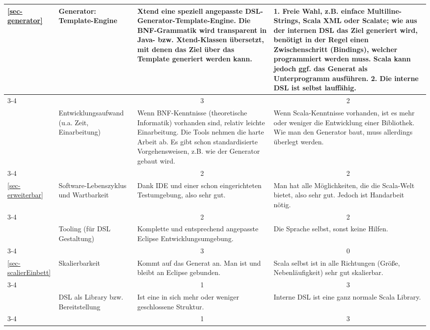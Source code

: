 \begin{landscape}
\begin{longtable}{|p{0.8cm}|p{4.4cm}|p{6.4cm}|p{6.4cm}|}
  \ref{sec-generator}
  & Generator: Template-Engine
  & Xtend eine speziell angepasste DSL-Generator-Template-Engine.
    Die BNF-Grammatik wird transparent in Java- bzw. Xtend-Klassen übersetzt,
    mit denen das Ziel über das Template generiert werden kann.
  & 1. Freie Wahl, z.B. einface Multiline-Strings, Scala XML oder Scalate;
    wie aus der internen DSL das Ziel generiert wird, benötigt in der Regel
    einen Zwischenschritt (Bindings), welcher programmiert werden muss.
    Scala kann jedoch ggf. das Generat als Unterprogramm ausführen.
    2. Die interne DSL ist selbst lauffähig.
  \\
  \cline{3-4}
  & & \multicolumn{1}{c|}{ 3 } & \multicolumn{1}{c|}{ 2 } \\ \hline

  & Entwicklungsaufwand (u.a. Zeit, Einarbeitung)
  & Wenn BNF-Kenntnisse (theoretische Informatik) vorhanden sind,
    relativ leichte Einarbeitung.
    Die Tools nehmen die harte Arbeit ab. Es gibt schon standardisierte
    Vorgehensweisen, z.B. wie der Generator gebaut wird.
  & Wenn Scala-Kenntnisse vorhanden, ist es mehr oder weniger die Entwicklung
    einer Bibliothek.
    Wie man den Generator baut, muss allerdings überlegt werden.
  \\
  \cline{3-4}
  & & \multicolumn{1}{c|}{ 2 } & \multicolumn{1}{c|}{ 2 } \\ \hline

  \ref{sec-erweiterbar}
  & Software-Lebenszyklus und Wartbarkeit
  & Dank IDE und einer schon eingerichteten Testumgebung, also sehr gut.
  & Man hat alle Möglichkeiten, die die Scala-Welt bietet, also sehr gut.
    Jedoch ist Handarbeit nötig.
  \\
  \cline{3-4}
  & & \multicolumn{1}{c|}{ 2 } & \multicolumn{1}{c|}{ 2 } \\ \hline

  & Tooling (für DSL Gestaltung)
  & Komplette und entsprechend angepasste Eclipse Entwicklungsumgebung.
  & Die Sprache selbst, sonst keine Hilfen.
  \\
  \cline{3-4}
  & & \multicolumn{1}{c|}{ 3 } & \multicolumn{1}{c|}{ 0 } \\ \hline

  \ref{sec-scalierEinbett}
  & Skalierbarkeit
  & Kommt auf das Generat an. Man ist und bleibt an Eclipse gebunden.
  & Scala selbst ist in alle Richtungen (Größe, Nebenläufigkeit) sehr gut
    skalierbar.
  \\
  \cline{3-4}
  & & \multicolumn{1}{c|}{ 1 } & \multicolumn{1}{c|}{ 3 } \\ \hline

  & DSL als Library bzw. Bereitstellung
  & Ist eine in sich mehr oder weniger geschlossene Struktur.
  & Interne DSL ist eine ganz normale Scala Library.
  \\
  \cline{3-4}
  & & \multicolumn{1}{c|}{ 1 } & \multicolumn{1}{c|}{ 3 } \\ \hline

\end{longtable}
\newpage
\end{landscape}


